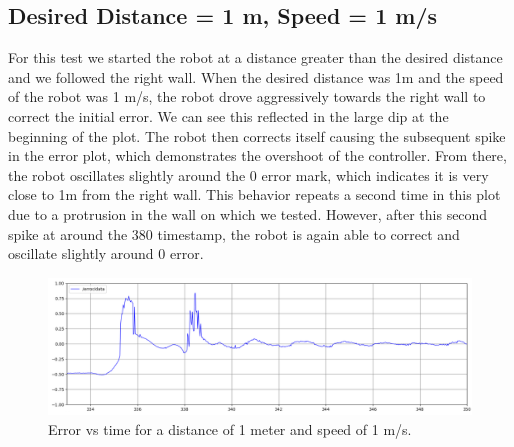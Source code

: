 \documentclass{article}
\begin{document}
\subsection{Desired Distance = 1 m, Speed = 1 m/s}
For this test we started the robot at a distance greater than the desired distance and we followed the right wall.
When the desired distance was 1m and the speed of the robot was 1 m/s, the robot drove aggressively towards the right wall to correct the initial error. We can see this reflected in the large dip at the beginning of the plot. The robot then corrects itself causing the subsequent spike in the error plot, which demonstrates the overshoot of the controller. From there, the robot oscillates slightly around the 0 error mark, which indicates it is very close to 1m from the right wall. This behavior repeats a second time in this plot due to a protrusion in the wall on which we tested. However, after this second spike at around the 380 timestamp, the robot is again able to correct and oscillate slightly around 0 error.
\begin{figure}[!h]
\begin{center}
\includegraphics[width=\textwidth]{error_speed_1_dist_1.png}
\caption{Error vs time for a distance of 1 meter and speed of 1 m/s.}
\end{center}
\end{figure}
\end{document}
